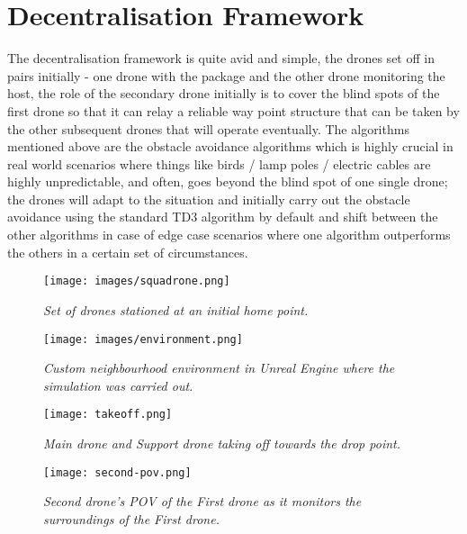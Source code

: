 \documentclass[preprint,12pt]{elsarticle}
\begin{document}
\section{Decentralisation Framework}

The decentralisation framework is quite avid and simple, the drones set off in pairs initially - one drone with the package and the other drone monitoring the host, the role of the secondary drone initially is to cover the blind spots of the first drone so that it can relay a reliable way point structure that can be taken by the other subsequent drones that will operate eventually. The algorithms mentioned above are the obstacle avoidance algorithms which is highly crucial in real world scenarios where things like birds / lamp poles / electric cables are highly unpredictable, and often, goes beyond the blind spot of one single drone; the drones will adapt to the situation and initially carry out the obstacle avoidance using the standard TD3 algorithm by default and shift between the other algorithms in case of edge case scenarios where one algorithm outperforms the others in a certain set of circumstances. \\

\graphicspath{ {./images/} }
\begin{figure}[!htbp]
  \centering
  \texttt{[image: images/squadrone.png]}
  \caption{\textit{Set of drones stationed at an initial home point.}}
  \label{fig:sqd}
\end{figure}

\graphicspath{ {./images/} }
\begin{figure}[!htbp]
  \centering
  \texttt{[image: images/environment.png]}
  \caption{\textit{Custom neighbourhood environment in Unreal Engine where the simulation was carried out.}}
  \label{fig:sqd}
\end{figure}

\graphicspath{ {./images/} }
\begin{figure}[!htbp]
  \centering
  \texttt{[image: takeoff.png]}
  \caption{\textit{Main drone and Support drone taking off towards the drop point.}}
  \label{fig:6}
\end{figure}

\graphicspath{ {./images/} }
\begin{figure}[!htbp]
  \centering
  \texttt{[image: second-pov.png]}
  \caption{\textit{Second drone's POV of the First drone as it monitors the surroundings of the First drone.}}
  \label{fig:7}
\end{figure}
\end{document}
